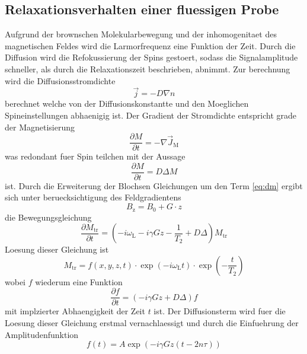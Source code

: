 \subsection{Relaxationsverhalten einer fluessigen Probe}%
\label{sub:relaxationsverhalten_einer_fluessigen_probe}
Aufgrund der brownschen Molekularbewegung und der inhomogenitaet des
magnetischen Feldes wird die Larmorfrequenz eine Funktion der Zeit. 
Durch die Diffusion wird die Refokussierung der Spins gestoert, sodass die
Signalamplitude schneller, als durch die Relaxationszeit beschrieben, abnimmt.
Zur berechnung wird die Diffusionsstromdichte 
\begin{equation}
		\vec{j} = -D \nabla n	
\end{equation}
berechnet welche von der Diffusionskonstantte und den Moeglichen
Spineinstellungen abhaenigig ist. 
Der Gradient der Stromdichte entspricht grade der Magnetisierung
\begin{equation}
		\frac{\partial M}{\partial t} = - \nabla \vec{J}_\text{M}
\end{equation}
was redondant fuer Spin  teilchen mit der Aussage 
\begin{equation}
		\label{eq:dm}
		\frac{\partial M}{\partial t} = D \Delta M
\end{equation}
ist. Durch die Erweiterung der Blochsen Gleichungen um den Term \ref{eq:dm}
ergibt sich unter beruecksichtigung des Feldgradientens
\begin{equation}
		\label{eq:gradB}
		B_\text{z} = B_0 + G \cdot z
\end{equation}
die Bewegungsgleichung
\begin{equation}
		\frac{\partial M_\text{tr}}{\partial t} = \left(- i \omega_\text{L} - i \gamma
Gz - \frac{1}{T_2} + D \Delta \right) M_\text{tr}
\end{equation}
Loesung dieser Gleichung ist 
\begin{equation}
		M_\text{tr} = f(x,y,z,t) \cdot \exp(-i\omega_\text{L}t) \cdot
		\exp\left(-\frac{t}{T_\text{2}}\right)
\end{equation}
wobei $f$ wiederum eine Funktion  
\begin{equation}
		\frac{\partial f}{\partial t} = \left(-i \gamma Gz + D \Delta \right) f
\end{equation}
mit implzierter Abhaengigkeit der Zeit $t$ ist.
Der Diffusionsterm wird fuer die Loesung dieser Gleichung erstmal vernachlaessigt 
und durch die Einfuehrung der Amplitudenfunktion 
\begin{equation}
		f(t) = A \exp \left( -i \gamma Gz ( t -2n\tau) \right)
\end{equation}
